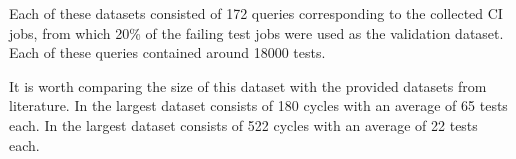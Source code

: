 Each of these datasets consisted of 172 queries corresponding to the collected CI jobs, from which 20\% 
of the failing test jobs were used as the validation dataset. Each of these queries
contained around 18000 tests.

It is worth comparing the size of this dataset with the provided datasets from literature.
In \cite{DBLP:journals/corr/abs-1811-04122} the largest dataset consists of 180 cycles
with an average of 65 tests each. In \cite{Bertolino2020LearningtoRankVR} the
largest dataset consists of 522 cycles with an average of 22 tests each.

